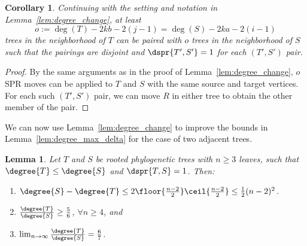 \documentclass{amsart}
\newtheorem{lemma}[theorem]{Lemma}
\newtheorem{corollary}[theorem]{Corollary}
\begin{document}
\begin{corollary}
\label{cor:paired_neighbors}
Continuing with the setting and notation in Lemma~\ref{lem:degree_change}, at least
$$o := \deg(T) - 2kb - 2(j-1) = \deg(S) - 2ka - 2(i-1)$$
trees in the neighborhood of $T$ can be paired with $o$ trees in the neighborhood of $S$ such that the pairings are disjoint and $\dspr{T',S'} = 1$ for each $(T',S')$ pair.
\end{corollary}
\begin{proof}
By the same arguments as in the proof of Lemma~\ref{lem:degree_change}, $o$ SPR moves can be applied to $T$ and $S$ with the same source and target vertices.
For each such $(T',S')$ pair, we can move $R$ in either tree to obtain the other member of the pair.
\end{proof}

We can now use Lemma~\ref{lem:degree_change} to improve the bounds in Lemma~\ref{lem:degree_max_delta} for the case of two adjacent trees.
\begin{lemma}
	\label{lem:degree_max_delta_adjacent}
	Let $T$ and $S$ be rooted phylogenetic trees with $n \ge 3$ leaves, such that $\degree{T} \le \degree{S}$ and $\dspr{T,S} = 1$.
	Then:
	\begin{enumerate}
		\item $\degree{S} - \degree{T} \le 2\floor{\frac{n-2}{2}}\ceil{\frac{n-2}{2}} \le \frac{1}{2} (n-2)^2 $.
		\item $\frac{\degree{T}}{\degree{S}} \ge \frac{5}{6}$, $\forall n \ge 4$, and
		\item $\lim_{n\rightarrow\infty}\frac{\degree{T}}{\degree{S}} =  \frac{6}{7}$.
	\end{enumerate}
\end{lemma}
\end{document}

